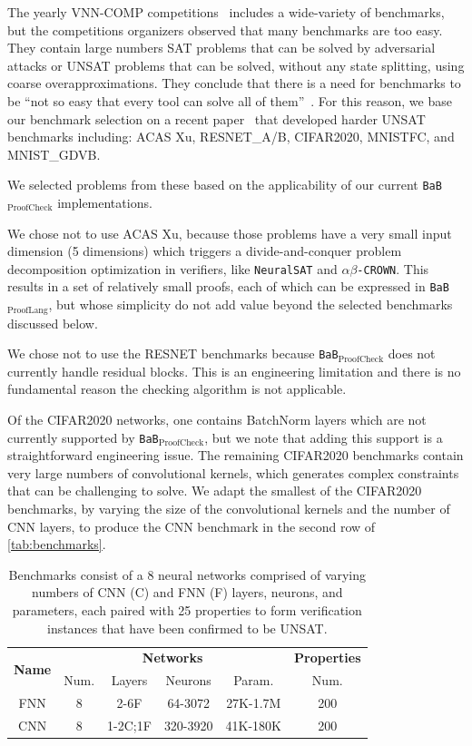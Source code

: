 \documentclass[oneside,11pt,dvipsnames]{book}
\newcommand{\prooflang}{\texttt{BaB$_{\text{ProofLang}}$}}
\newcommand{\proofcheck}{\texttt{BaB$_{\text{ProofCheck}}$}}
\newcommand{\crown}{\texttt{$\alpha\beta$-CROWN}}
\newcommand{\neuralsat}{\texttt{NeuralSAT}}
\begin{document}
The yearly VNN-COMP competitions~\cite{brix2023first,brix2023fourth,bak2021second} includes a wide-variety of benchmarks,
but the competitions organizers observed that many benchmarks are too easy.
They contain large numbers SAT problems that can be solved by adversarial attacks 
or UNSAT problems that can be solved, without any state splitting, using coarse overapproximations.
They conclude that there is a need 
for benchmarks to be ``not so easy that every tool can solve all of them''~\cite{brix2023first}.
For this reason, we base our benchmark selection on a recent paper~\cite{duong2024harnessing} that developed harder
UNSAT benchmarks including:
ACAS Xu, RESNET\_A/B, CIFAR2020, MNISTFC, and MNIST\_GDVB.

We selected problems from these based on the applicability of our
current \proofcheck{} implementations.

We chose not to use ACAS Xu, because those problems have a very small
input dimension (5 dimensions) which triggers a divide-and-conquer problem
decomposition optimization in verifiers, like \neuralsat{} and \crown{}.
This results in a set of relatively small proofs, each of which
can be expressed in \prooflang{}, but whose simplicity do not add
value beyond the selected benchmarks discussed below.

We chose not to use the RESNET benchmarks because  \proofcheck{} does not currently handle residual blocks.  This is an engineering limitation and there is no fundamental reason the checking algorithm is not applicable.  

Of the CIFAR2020 networks, one contains BatchNorm layers which are not currently
supported by \proofcheck{}, but we note that adding this support is a straightforward
engineering issue.
The remaining CIFAR2020 benchmarks contain very large numbers of convolutional
kernels, which generates complex constraints that can be challenging to solve.
We adapt the smallest of the CIFAR2020 benchmarks, by varying the size of the
convolutional kernels and the number of CNN layers, to produce 
the CNN benchmark in the second row of \autoref{tab:benchmarks}.
\begin{table}[t]
    \footnotesize
    \centering
    \caption{Benchmarks consist of a 8 neural networks comprised of varying numbers of CNN (C) and FNN (F) layers, neurons, and parameters, each paired with 25 properties to form verification instances that have been confirmed to be UNSAT.}\label{tab:benchmarks}
    \begin{tabular}{c|cccc|c}
        \toprule
        \multirow{2}{*}{\textbf{Name}} &\multicolumn{4}{c|}{\textbf{Networks}} & \textbf{Properties}\\
        & Num. & Layers & Neurons & Param. & Num. \\

        \midrule
        FNN        & 8 & 2-6F &  64-3072 & 27K-1.7M & 200  \\
        \midrule
        CNN        & 8 & 1-2C;1F  &  320-3920 & 41K-180K & 200  \\
        \bottomrule
    \end{tabular}
\end{table}
\end{document}
